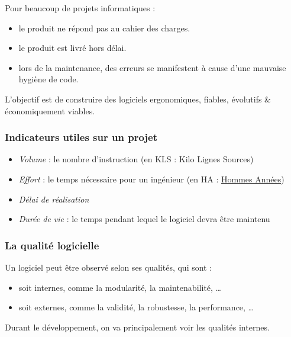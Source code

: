 Pour beaucoup de projets informatiques :

\begin{itemize}
\tightlist
\item
  le produit ne répond pas au cahier des charges.
\item
  le produit est livré hors délai.
\item
  lors de la maintenance, des erreurs se manifestent à cause d'une
  mauvaise hygiène de code.
\end{itemize}

L'objectif est de construire des logiciels ergonomiques, fiables,
évolutifs \& économiquement viables.

\hypertarget{indicateurs-utiles-sur-un-projet}{%
\subsubsection{Indicateurs utiles sur un
projet}\label{indicateurs-utiles-sur-un-projet}}

\begin{itemize}
\tightlist
\item
  \emph{Volume} : le nombre d'instruction (en KLS : Kilo Lignes Sources)
\item
  \emph{Effort} : le temps nécessaire pour un ingénieur (en HA :
  \href{https://fr.wiktionary.org/wiki/homme-ann\%C3\%A9e}{Hommes
  Années})
\item
  \emph{Délai de réalisation}
\item
  \emph{Durée de vie} : le temps pendant lequel le logiciel devra être
  maintenu
\end{itemize}

\hypertarget{la-qualituxe9-logicielle}{%
\subsubsection{La qualité logicielle}\label{la-qualituxe9-logicielle}}

Un logiciel peut être observé selon ses qualités, qui sont :

\begin{itemize}
\tightlist
\item
  soit internes, comme la modularité, la maintenabilité, \ldots{}
\item
  soit externes, comme la validité, la robustesse, la performance,
  \ldots{}
\end{itemize}

Durant le développement, on va principalement voir les qualités
internes.

